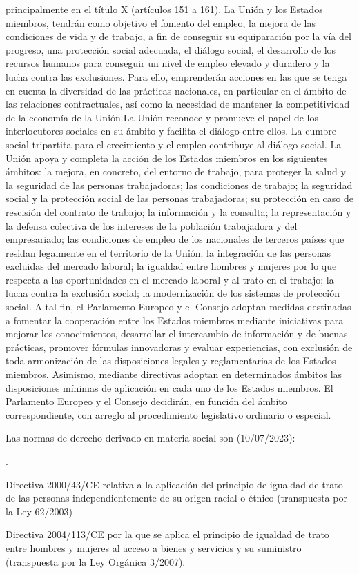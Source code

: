 \documentclass[10pt,a4paper]{article}
\newcounter{numitem}
\newenvironment{lnum}
      {\begin{list}{\arabic{numitem}.}{%
          \usecounter{numitem}%
          \setlength{\leftmargin}{1cm}%
          \setlength{\parskip}{3pt}%
          \setlength{\itemsep}{0pt}%
          \setlength{\parsep}{0pt}%
      }}
      {\end{list}}
\begin{document}
principalmente en el título X (artículos 151 a 161). La Unión y los Estados miembros, tendrán como objetivo el fomento del empleo, la mejora de las condiciones de vida y de trabajo, a fin de conseguir su equiparación por la vía del progreso, una protección social adecuada, el diálogo social, el desarrollo de los recursos humanos para conseguir un nivel de empleo elevado y duradero y la lucha contra las exclusiones. Para ello, emprenderán acciones en las que se tenga en cuenta la diversidad de las prácticas nacionales, en particular en el ámbito de las relaciones contractuales, así como la necesidad de mantener la competitividad de la economía de la Unión.La Unión reconoce y promueve el papel de los interlocutores sociales en su ámbito y facilita el diálogo entre ellos. La cumbre social tripartita para el crecimiento y el empleo contribuye al diálogo social. La Unión apoya y completa la acción de los Estados miembros en los siguientes ámbitos: la mejora, en concreto, del entorno de trabajo, para proteger la salud y la seguridad de las personas trabajadoras; las condiciones de trabajo; la seguridad social y la protección social de las personas trabajadoras; su protección en caso de rescisión del contrato de trabajo; la información y la consulta; la representación y la defensa colectiva de los intereses de la población trabajadora y del empresariado; las condiciones de empleo de los nacionales de terceros países que residan legalmente en el territorio de la Unión; la integración de las personas excluidas del mercado laboral; la igualdad entre hombres y mujeres por lo que respecta a las oportunidades en el mercado laboral y al trato en el trabajo; la lucha contra la exclusión social; la modernización de los sistemas de protección social. A tal fin, el Parlamento Europeo y el Consejo adoptan medidas destinadas a fomentar la cooperación entre los Estados miembros mediante iniciativas para mejorar los conocimientos, desarrollar el intercambio de información y de buenas prácticas, promover fórmulas innovadoras y evaluar experiencias, con exclusión de toda armonización de las disposiciones legales y reglamentarias de los Estados miembros. Asimismo, mediante directivas adoptan en determinados ámbitos las disposiciones mínimas de aplicación en cada uno de los Estados miembros. El Parlamento Europeo y el Consejo decidirán, en función del ámbito correspondiente, con arreglo al procedimiento legislativo ordinario o especial.

Las normas de derecho derivado en materia social son (\textcolor{yellos}{10/07/2023}):
\begin{lnum}
    \item Directiva 2000/43/CE relativa a la aplicación del principio de igualdad de trato de las personas independientemente de su origen racial o étnico (transpuesta por la Ley 62/2003)
    \item Directiva 2004/113/CE por la que se aplica el principio de igualdad de trato entre hombres y mujeres al acceso a bienes y servicios y su suministro (transpuesta por la Ley Orgánica 3/2007).
\end{lnum}
\end{document}
